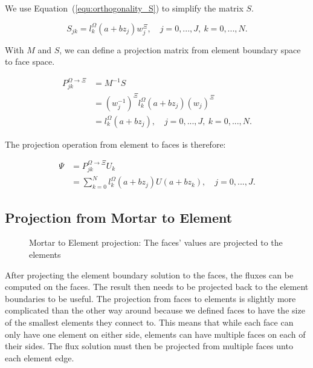 We use Equation~(\ref{equ:orthogonality_S}) to simplify the matrix $S$.

\begin{equation}
	S_{jk} = l_k^{\Omega }\left ( a + bz_j \right )w_j^{\Xi}, \quad j = 0, ..., J, \: k = 0, ..., N.
\end{equation}

With $M$ and $S$, we can define a projection matrix from element boundary space to face space.

\begin{equation}
	\begin{aligned}
		P_{jk} ^ {\Omega  \rightarrow \Xi} &= M^{-1}S \\
		&= (w_j ^{-1})^{\Xi }  l_k ^ \Omega (a + b z_j)(w_j)^{\Xi} \\
		&= l_k ^ \Omega (a + b z_j), \quad j = 0, ..., J, \: k = 0, ..., N.
	\end{aligned}
\end{equation}

The projection operation from element to faces is therefore:

\begin{align}  \label{projection_element_to_face}
	\Psi &= P_{jk}^{\Omega \rightarrow \Xi} U_k  \\
	&= \sum_{k = 0}^{N}l_k ^ \Omega(a+ b z_j) U(a + b z_k), \quad j = 0, ..., J.
\end{align}

\subsection{Projection from Mortar to Element} \label{section:adaptive_mesh_refinement:mortar_element_method:mortar_to_element}

\begin{figure}[H]
	\centering
	
	\caption{Mortar to Element projection: The faces' values are projected to the elements}
	\label{fig:mortar_to_element}
\end{figure}

After projecting the element boundary solution to the faces, the fluxes can be computed on the
faces. The result then needs to be projected back to the element boundaries to be useful. The
projection from faces to elements is slightly more complicated than the other way around because we
defined faces to have the size of the smallest elements they connect to. This means that while each
face can only have one element on either side, elements can have multiple faces on each of their
sides. The flux solution must then be projected from multiple faces unto each element edge.

